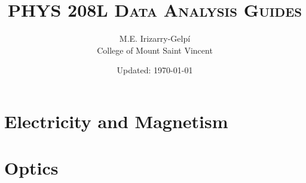 \documentclass[letterpaper, 12pt]{report}
\begin{document}
\title{\textsc{PHYS 208L Data Analysis Guides}}
\author{M.E. Irizarry-Gelp\'{i}\\College of Mount Saint Vincent}
\date{Updated: \today}
\maketitle
\tableofcontents
\part{Electricity and Magnetism}




% 


\part{Optics}





\begin{appendices}
    
\end{appendices}
\end{document}
